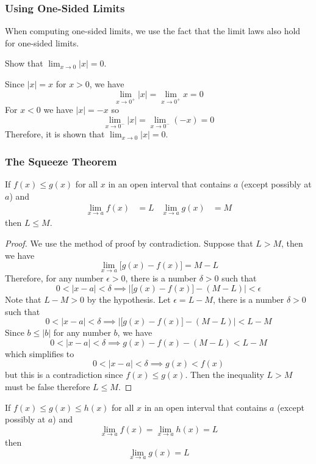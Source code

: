 \subsubsection*{Using One-Sided Limits}
When computing one-sided limits, we use the fact that the limit laws also hold
for one-sided limits.
\begin{problem}
    Show that \(\displaystyle{\lim_{x\to 0}|x|=0}\).
\end{problem}
\begin{solution}
    Since \(|x|=x\) for \(x>0\), we have
    \[\lim_{x\to 0^+}|x|=\lim_{x\to 0^+}x=0\]
    For \(x<0\) we have \(|x|=-x\) so
    \[\lim_{x\to 0^-}|x|=\lim_{x\to 0^-}(-x)=0\]
    Therefore, it is shown that \(\displaystyle{\lim_{x\to 0}|x|=0}\).
\end{solution}

\subsubsection*{The Squeeze Theorem}
\begin{theorem}
    If \(f(x)\leq g(x)\) for all \(x\) in an open interval that contains
    \(a\) (except possibly at \(a\)) and
    \begin{align*}
        \lim_{x\to a}f(x) &= L & \lim_{x\to a}g(x) &= M
    \end{align*}
    then \(L\leq M\).
\end{theorem}
\begin{proof}
    We use the method of proof by contradiction.
    Suppose  that \(L>M\), then we have
    \[\lim_{x\to a}\bigl[g(x)-f(x)\bigr]=M-L\]
    Therefore, for any number \(\epsilon>0\),
    there is a number \(\delta>0\) such that
    \[0<|x-a|<\delta\implies
    \left|\bigl[g(x)-f(x)\bigr]-(M-L)\right|<\epsilon\]
    Note that \(L-M>0\) by the hypothesis.
    Let \(\epsilon=L-M\), there is a number \(\delta>0\) such that
    \[0<|x-a|<\delta\implies\left|\bigl[g(x)-f(x)\bigr]-(M-L)\right|<L-M\]
    Since \(b\leq|b|\) for any number \(b\), we have
    \[0<|x-a|<\delta\implies g(x)-f(x)-(M-L)<L-M\]
    which simplifies to
    \[0<|x-a|<\delta\implies g(x)<f(x)\]
    but this is a contradiction since \(f(x)\leq g(x)\).
    Then the inequality \(L>M\) must be false therefore \(L\leq M\).
\end{proof}
\begin{theorem}
    If \(f(x)\leq g(x)\leq h(x)\) for all \(x\) in an open interval that
    contains \(a\) (except possibly at \(a\)) and
    \[\lim_{x\to a}f(x)=\lim_{x\to a}h(x)=L\]
    then
    \[\lim_{x\to a}g(x)=L\]
\end{theorem}

